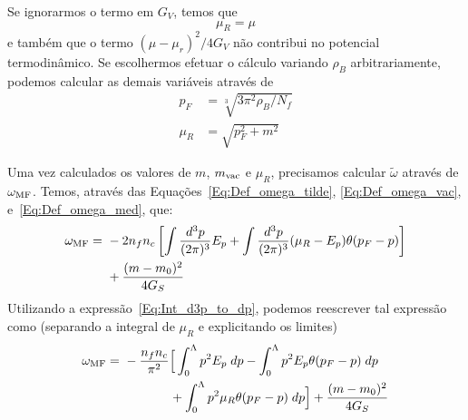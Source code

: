 Se ignorarmos o termo em $G_V$, temos que 
\begin{equation}
	\mu_R = \mu
\end{equation}
%
e também que o termo $(\mu-\mu_r)^2/ 4G_V$ não contribui no potencial termodinâmico. Se escolhermos efetuar o cálculo variando $\rho_B$ arbitrariamente, podemos calcular as demais variáveis através de
\begin{align}
	p_F &= \sqrt[3]{3 \pi^2 \rho_B / N_f} \\
	\mu_R &= \sqrt{p_F^2 + m^2}
\end{align}

Uma vez calculados os valores de $m$, $m_{\rm{vac}}$ e $\mu_R$, precisamos calcular $\tilde\omega$ através de $\omega_{\rm{MF}}$. Temos, através das Equações~\eqref{Eq:Def_omega_tilde}, \eqref{Eq:Def_omega_vac}, e~\eqref{Eq:Def_omega_med}, que:
\begin{equation}\label{Eq:Pot_term_MF_sem_G_V}
\begin{split}
\omega_{\rm{MF}} =&~ -2 n_f n_c \left[\int\frac{d^3p}{(2\pi)^3} E_p + \int\frac{d^3p}{(2\pi)^3}(\mu_R - E_p)\theta(p_F - p)\right] \\
&~+ \frac{(m-m_0)^2}{4G_S}
\end{split}
\end{equation}
%
Utilizando a expressão~\eqref{Eq:Int_d3p_to_dp}, podemos reescrever tal expressão como (separando a integral de $\mu_R$ e explicitando os limites)
\begin{equation}
\begin{split}
\omega_{\rm{MF}} =&~ - \frac{n_f n_c}{\pi^2} \Big[\int_0^\Lambda p^2E_p \; dp - \int_0^\Lambda p^2 E_p \theta(p_F - p)\;dp \\
&~\phantom{- \frac{n_f n_c}{\pi^2} \Big[} + \int_0^\Lambda p^2 \mu_R \theta(p_F - p)\;dp \Big] + \frac{(m-m_0)^2}{4G_S}
\end{split}
\end{equation}

